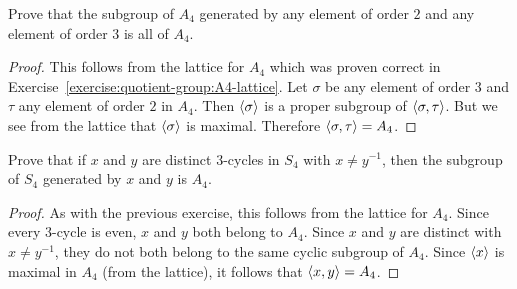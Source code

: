  Prove that the subgroup of $A_4$ generated by any
element of order $2$ and any element of order $3$ is all of $A_4$.
\begin{proof}
  This follows from the lattice for $A_4$ which was proven correct in
  Exercise~\ref{exercise:quotient-group:A4-lattice}. Let $\sigma$ be
  any element of order $3$ and $\tau$ any element of order $2$ in
  $A_4$. Then $\langle{\sigma}\rangle$ is a proper subgroup of
  $\langle{\sigma,\tau}\rangle$. But we see from the lattice that $\langle{\sigma}\rangle$
  is maximal. Therefore $\langle{\sigma,\tau}\rangle = A_4$.
\end{proof}

 Prove that if $x$ and $y$ are distinct $3$-cycles in
$S_4$ with $x\neq y^{-1}$, then the subgroup of $S_4$ generated by $x$
and $y$ is $A_4$.
\begin{proof}
  As with the previous exercise, this follows from the lattice for
  $A_4$. Since every $3$-cycle is even, $x$ and $y$ both belong to
  $A_4$. Since $x$ and $y$ are distinct with $x\neq y^{-1}$, they do
  not both belong to the same cyclic subgroup of $A_4$. Since
  $\langle{x}\rangle$ is maximal in $A_4$ (from the lattice), it follows that
  $\langle{x,y}\rangle = A_4$.
\end{proof}
